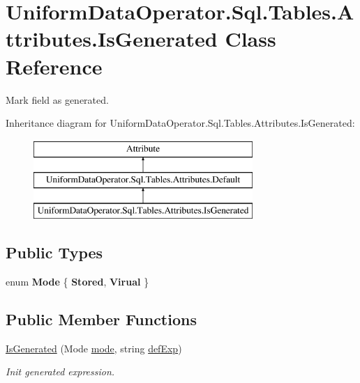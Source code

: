 \hypertarget{class_uniform_data_operator_1_1_sql_1_1_tables_1_1_attributes_1_1_is_generated}{}\section{Uniform\+Data\+Operator.\+Sql.\+Tables.\+Attributes.\+Is\+Generated Class Reference}
\label{class_uniform_data_operator_1_1_sql_1_1_tables_1_1_attributes_1_1_is_generated}


Mark field as generated.  


Inheritance diagram for Uniform\+Data\+Operator.\+Sql.\+Tables.\+Attributes.\+Is\+Generated\+:\begin{figure}[H]
\begin{center}
\leavevmode
\includegraphics[height=3.000000cm]{dd/db4/class_uniform_data_operator_1_1_sql_1_1_tables_1_1_attributes_1_1_is_generated}
\end{center}
\end{figure}
\subsection*{Public Types}
\begin{DoxyCompactItemize}
\item 
\mbox{\label{class_uniform_data_operator_1_1_sql_1_1_tables_1_1_attributes_1_1_is_generated_aac521588c251e4dac4b3eebf96db38d2}} 
enum {\bfseries Mode} \{ {\bfseries Stored}, 
{\bfseries Virual}
 \}
\end{DoxyCompactItemize}
\subsection*{Public Member Functions}
\begin{DoxyCompactItemize}
\item 
\mbox{\hyperlink{class_uniform_data_operator_1_1_sql_1_1_tables_1_1_attributes_1_1_is_generated_ae7a7020b285f0208b1ec1e19bbee3814}{Is\+Generated}} (Mode \mbox{\hyperlink{class_uniform_data_operator_1_1_sql_1_1_tables_1_1_attributes_1_1_is_generated_af3fa1eea5f12c0a0f8128b794df15b78}{mode}}, string \mbox{\hyperlink{class_uniform_data_operator_1_1_sql_1_1_tables_1_1_attributes_1_1_default_af6b009142552ad61a6e17e9dd401b84e}{def\+Exp}})
\begin{DoxyCompactList}\small\item\em Init generated expression. \end{DoxyCompactList}\end{DoxyCompactItemize}

